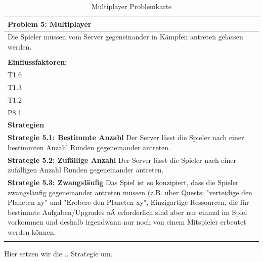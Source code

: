 \documentclass[fontsize=12pt,paper=a4,twoside]{scrartcl}
\begin{document}
\begin{table}[H]
    \centering
    \begin{tabular}{|p{15cm}|}
    \hline
          \textbf{Problem 5: Multiplayer}  \\ \hline
	Die Spieler müssen vom Server gegeneinander in Kämpfen antreten gelassen werden. \\
         \\ \hline
          \textbf{Einflussfaktoren: } \\
	T1.6 \\
	T1.3 \\
	T1.2 \\
	P8.1 \\
          \hline
          \textbf{Strategien} \\ \hline
            {}          
           \label{strategie:5.1}     
          \textbf{Strategie 5.1: Bestimmte Anzahl}  Der Server lässt die Spieler nach einer bestimmten Anzahl Runden gegeneinander antreten. \\        
  {}          
           \label{strategie:5.2}              
          \textbf{Strategie 5.2: Zufällige Anzahl} Der Server lässt die Spieler nach einer zufälligen Anzahl Runden gegeneinander antreten.   \\
	 {}          
           \label{strategie:5.3}     
          \textbf{Strategie 5.3: Zwangsläufig} Das Spiel ist so konzipiert, dass die Spieler zwangsläufig gegeneinander antreten müssen (z.B. über Quests: "verteidige den Planeten xy" und "Erobere den Planeten xy", Einzigartige Ressourcen, die für bestimmte Aufgaben/Upgrades oÄ erforderlich sind aber nur einmal im Spiel vorkommen und deshalb irgendwann nur noch von einem Mitspieler erbeutet werden können.  \\ 
	 \\ \hline
    \end{tabular}

    \caption{Multiplayer Problemkarte}
    \label{tab:ProblemKarte5}
\end{table}
Hier setzen wir die .. Strategie um. \\
\end{document}
